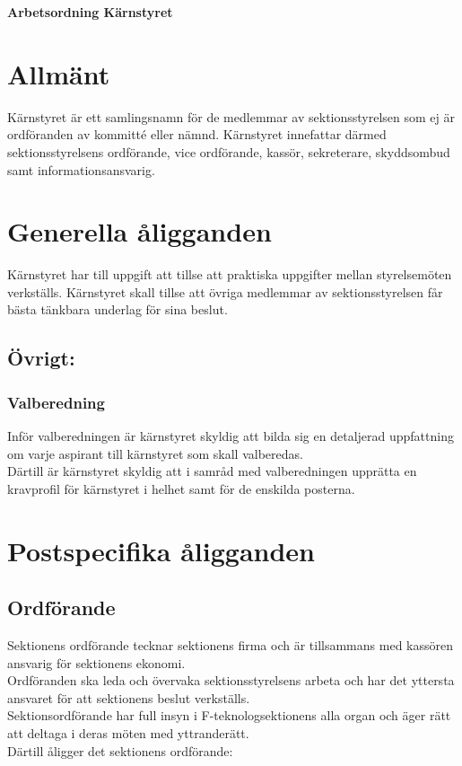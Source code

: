 

\renewcommand{\dateseparator}{-} %

\renewcommand{\forening}{Kärstyret }

\begin{center}
\LARGE{\textbf{Arbetsordning Kärnstyret}}
\end{center}



\section{Allmänt}
Kärnstyret är ett samlingsnamn för de medlemmar av sektionsstyrelsen som ej är ordföranden av kommitté eller nämnd. Kärnstyret innefattar därmed sektionsstyrelsens ordförande, vice ordförande, kassör, sekreterare, skyddsombud samt informationsansvarig.

\section{Generella åligganden}
Kärnstyret har till uppgift att tillse att praktiska uppgifter mellan styrelsemöten verkställs. Kärnstyret skall tillse att övriga medlemmar av sektionsstyrelsen får bästa tänkbara underlag för sina beslut.

\subsection{Övrigt:}

\subsubsection{Valberedning}
Inför valberedningen är kärnstyret skyldig att bilda sig en detaljerad uppfattning om varje aspirant till kärnstyret som skall valberedas.\\
Därtill är kärnstyret skyldig att i samråd med valberedningen upprätta en kravprofil för kärnstyret i helhet samt för de enskilda posterna.



\section{Postspecifika åligganden}

\subsection{Ordförande}
Sektionens ordförande tecknar sektionens firma och är tillsammans med kassören ansvarig för sektionens ekonomi.\\
Ordföranden ska leda och övervaka sektionsstyrelsens arbeta och har det yttersta ansvaret för att sektionens beslut verkställs.\\
Sektionsordförande har full insyn i F-teknologsektionens alla organ och äger rätt att deltaga i deras möten med yttranderätt.\\
Därtill åligger det sektionens ordförande:


